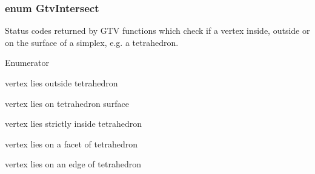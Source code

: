 \subsubsection[{Gtv\+Intersect}]{\setlength{\rightskip}{0pt plus 5cm}enum {\bf Gtv\+Intersect}}\label{group__status_gab1a7c0fd996feb29fd2412deb08ff573}
Status codes returned by G\+T\+V functions which check if a vertex inside, outside or on the surface of a simplex, e.\+g. a tetrahedron. \begin{Desc}
\item[Enumerator]\par
\begin{description}
\item[{\em 
G\+T\+V\+\_\+\+O\+N\label{group__status_ggab1a7c0fd996feb29fd2412deb08ff573a6a8fd3e68363fb62392bc22ca76a0f8c}
}]vertex lies outside tetrahedron \item[{\em 
G\+T\+V\+\_\+\+I\+N\label{group__status_ggab1a7c0fd996feb29fd2412deb08ff573aba23b5b7151d8eee3ce6b251a0d90cd1}
}]vertex lies on tetrahedron surface \item[{\em 
G\+T\+V\+\_\+\+O\+N\+\_\+\+F\+A\+C\+E\+T\label{group__status_ggab1a7c0fd996feb29fd2412deb08ff573a7dcd577dd01f7de220eccfc92704ce22}
}]vertex lies strictly inside tetrahedron \item[{\em 
G\+T\+V\+\_\+\+O\+N\+\_\+\+E\+D\+G\+E\label{group__status_ggab1a7c0fd996feb29fd2412deb08ff573af4bb77bc3b387349720f91b338c8cc41}
}]vertex lies on a facet of tetrahedron \item[{\em 
G\+T\+V\+\_\+\+O\+N\+\_\+\+V\+E\+R\+T\+E\+X\label{group__status_ggab1a7c0fd996feb29fd2412deb08ff573a1a1783e49d5482d45376295e4701efbd}
}]vertex lies on an edge of tetrahedron \end{description}
\end{Desc}
